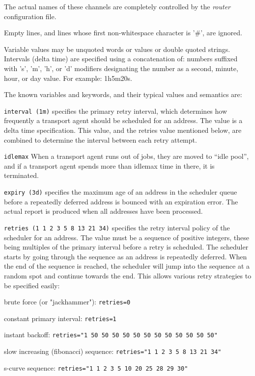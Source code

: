 The  actual  names  of  these channels are completely 
controlled by the {\em router\/} configuration file.

Empty  lines,  and  lines   whose   first   non-whitespace
character is '\#', are ignored.

Variable values may be unquoted words or values or double 
quoted strings.  Intervals  (delta  time)  are  specified
using  a concatenation of: numbers suffixed with 's', 'm',
'h', or 'd' modifiers designating the number as a  second,
minute, hour, or day value.  For example: 1h5m20s.

The known variables and keywords, and their typical values
and semantics are:

{\tt interval (1m)}
specifies the primary retry interval, which determines how frequently a 
transport agent should be scheduled for an address. The value is a delta
time specification. This value, and the retries value mentioned below, 
are combined to determine the interval between each retry attempt.

{\tt idlemax}
When a transport agent runs out of jobs, they are moved
to ``idle pool'', and if a transport agent spends more than idlemax
time in there, it is terminated.

{\tt expiry (3d)}
specifies  the  maximum age of an address in the scheduler 
queue before  a repeatedly  deferred  address  is
bounced with an expiration error.  The actual report is
produced when all addresses have been processed.

{\tt retries (1 1 2 3 5 8 13 21 34)} 
specifies the retry interval policy  of the scheduler 
for an address. The value must be a sequence of positive integers, these 
being multiples of the primary interval  before  a  retry is scheduled. 
The scheduler starts by going through the sequence as an  address  is 
repeatedly deferred. When the end of the sequence is reached, the scheduler 
will jump into the sequence at a random  spot and continue towards the end.  
This allows various retry strategies to be specified easily:

brute force (or "jackhammer"): {\tt  retries=0 }

constant primary interval: {\tt  retries=1 }

instant backoff: {\tt  retries="1 50 50 50 50 50 50 50 50 50 50 50 50" }

slow increasing (fibonacci) sequence: {\tt  retries="1 1 2 3 5 8 13 21 34" }

s-curve sequence: {\tt  retries="1 1 2 3 5 10 20 25 28 29 30" }

